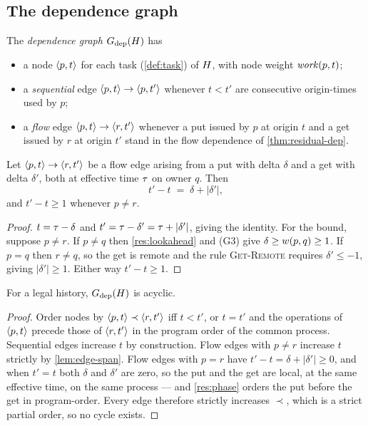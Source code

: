 \subsection{The dependence graph}
\label{sec:sync-dag}

\begin{definition}\label{def:depgraph}
The \emph{dependence graph} $G_{\mathrm{dep}}(H)$ has
\begin{itemize}[leftmargin=1.5em,itemsep=1pt]
  \item a node $\langle p, t\rangle$ for each task (\cref{def:task}) of $H$, with
    node weight $\mathit{work}(p,t)$;
  \item a \emph{sequential} edge $\langle p, t\rangle \to \langle p, t'\rangle$ whenever $t <
    t'$ are consecutive \glspl{origin-time} used by $p$;
  \item a \emph{flow} edge $\langle p, t\rangle \to \langle r, t'\rangle$ whenever a put
    issued by $p$ at origin $t$ and a get issued by $r$ at origin $t'$ stand
    in the flow dependence of \cref{thm:residual-dep}.
\end{itemize}
\end{definition}

\begin{lemma}\label{lem:edge-span}
Let $\langle p, t\rangle \to \langle r, t'\rangle$ be a flow edge arising from a put with
\gls{delta} $\delta$ and a get with delta $\delta'$, both at effective time $\tau$
on owner $q$. Then
\[
  t' - t \;=\; \delta + |\delta'| ,
\]
and $t' - t \ge 1$ whenever $p \ne r$.
\end{lemma}

\begin{proof}
$t = \tau - \delta$ and $t' = \tau - \delta' = \tau + |\delta'|$, giving the
identity. For the bound, suppose $p \ne r$. If $p \ne q$ then
\cref{res:lookahead} and (G3) give $\delta \ge w(p,q) \ge 1$. If $p = q$
then $r \ne q$, so the get is remote and the rule \textsc{Get-Remote} requires
$\delta' \le -1$, giving $|\delta'| \ge 1$. Either way $t' - t \ge 1$.
\end{proof}

\begin{theorem}[Schedulability]\label{thm:acyclic}
For a legal history, $G_{\mathrm{dep}}(H)$ is acyclic.
\end{theorem}

\begin{proof}
Order nodes by $\langle p, t\rangle \prec \langle r, t'\rangle$ iff $t < t'$, or $t = t'$ and
the operations of $\langle p, t\rangle$ precede those of $\langle r, t'\rangle$ in the program
order of the common process. Sequential edges increase $t$ by construction. Flow
edges with $p \ne r$ increase $t$ strictly by \cref{lem:edge-span}. Flow edges
with $p = r$ have $t' - t = \delta + |\delta'| \ge 0$, and when $t' = t$ both
$\delta$ and $\delta'$ are zero, so the put and the get are local, at the same
effective time, on the same process --- and \cref{res:phase} orders the put
before the get in \gls{program-order}. Every edge therefore strictly increases
$\prec$, which is a strict partial order, so no cycle exists.
\end{proof}

